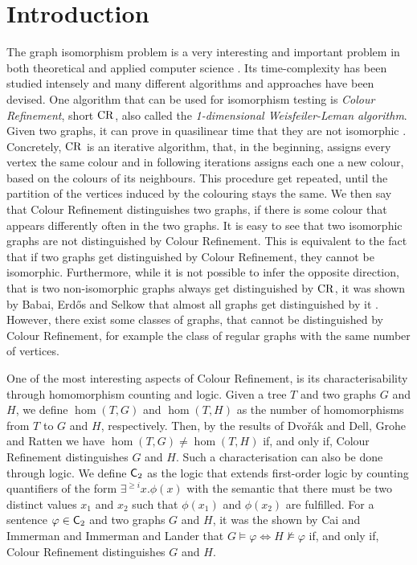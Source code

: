 \section{Introduction}

The graph isomorphism problem is a very interesting and important problem in both theoretical and applied computer science \cite{grohe2020GraphIsomorphism}.
Its time-complexity has been studied intensely and many different algorithms and approaches have been devised.
One algorithm that can be used for isomorphism testing is \emph{Colour Refinement}, short $\operatorname{CR}$, also called the \emph{1-dimensional Weisfeiler-Leman algorithm}.
Given two graphs, it can prove in quasilinear time that they are not isomorphic \cite{berkholz2017TightLowera}.
Concretely, $\operatorname{CR}$ is an iterative algorithm, that, in the beginning, assigns every vertex the same colour and in following iterations assigns each one a new colour, based on the colours of its neighbours.
This procedure get repeated, until the partition of the vertices induced by the colouring stays the same. 
We then say that Colour Refinement distinguishes two graphs, if there is some colour that appears differently often in the two graphs.
It is easy to see that two isomorphic graphs are not distinguished by Colour Refinement.
This is equivalent to the fact that if two graphs get distinguished by Colour Refinement, they cannot be isomorphic.
Furthermore, while it is not possible to infer the opposite direction, that is two non-isomorphic graphs always get distinguished by $\operatorname{CR}$, it was shown by Babai, Erd\H{o}s and Selkow that almost all graphs get distinguished by it \cite{babai1980RandomGraph}.
However, there exist some classes of graphs, that cannot be distinguished by Colour Refinement, for example the class of regular graphs with the same number of vertices.

One of the most interesting aspects of Colour Refinement, is its characterisability through homomorphism counting and logic.
Given a tree $T$ and two graphs $G$ and $H$, we define $\hom(T, G)$ and $\hom(T,H)$ as the number of homomorphisms from $T$ to $G$ and $H$, respectively.
Then, by the results of Dvo\v r\'ak \cite{dvorak2010RecognizingGraphsa} and Dell, Grohe and Ratten \cite{dell2018LovaszMeets} we have $\hom(T, G)\neq\hom(T, H)$ if, and only if, Colour Refinement distinguishes $G$ and $H$.
Such a characterisation can also be done through logic.
We define $\mathsf{C}_{2}$ as the logic that extends first-order logic by counting quantifiers of the form $\exists^{\geq i} x.\phi(x)$ with the semantic that there must be two distinct values $x_1$ and $x_2$ such that $\phi(x_1)$ and $\phi(x_2)$ are fulfilled.
For a sentence $\varphi\in \mathsf{C}_{2}$ and two graphs $G$ and $H$, it was the shown by Cai and Immerman \cite{cai1992OptimalLower} and Immerman and Lander \cite{immerman1990DescribingGraphs} that $G\models \varphi \Leftrightarrow H\not\models \varphi$ if, and only if, Colour Refinement distinguishes $G$ and $H$.


